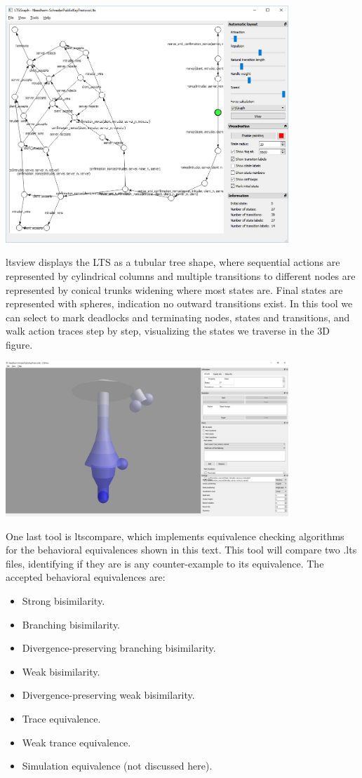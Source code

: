 \documentclass[11pt]{article}
\theoremstyle{definition}
\theoremstyle{plain}
\theoremstyle{definition}
\begin{document}
\includegraphics[width=0.8\textwidth, keepaspectratio]{img/mCRL2/mcrl2-ltsgraph.png}

ltsview displays the LTS as a tubular tree shape, where sequential actions are represented by cylindrical columns and multiple transitions to different nodes are represented by conical trunks widening where most states are. Final states are represented with spheres, indication no outward transitions exist. In this tool we can select to mark deadlocks and terminating nodes, states and transitions, and walk action traces step by step, visualizing the states we traverse in the 3D figure.

\includegraphics[width=0.8\textwidth, keepaspectratio]{img/mCRL2/mcrl2-ltsview.png}

One last tool is ltscompare, which implements equivalence checking algorithms for the behavioral equivalences shown in this text. This tool will compare two .lts files, identifying if they are is any counter-example to its equivalence. The accepted behavioral equivalences are:

\begin{itemize}
	\item Strong bisimilarity.
	\item Branching bisimilarity.
	\item Divergence-preserving branching bisimilarity.
	\item Weak bisimilarity.
	\item Divergence-preserving weak bisimilarity.
	\item Trace equivalence.
	\item Weak trance equivalence.
	\item Simulation equivalence (not discussed here).
\end{itemize}
\end{document}

